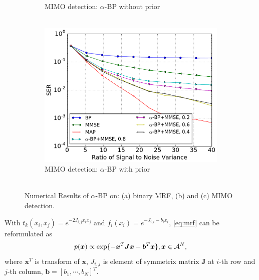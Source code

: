 \documentclass[conference]{IEEEtran}
\begin{document}
\begin{figure}[!ht]
\begin{subfigure}{.33\textwidth}
    \vspace{-0.6cm}
    \caption{MIMO detection: $\alpha$-BP without prior\\~}\label{fig:mimo_a}
  \end{subfigure}
  \begin{subfigure}{.33\textwidth}
    \includegraphics[width=1\linewidth]{figures/prior_mmse_alpha_compare_crop.pdf}
    \vspace{-0.6cm}
    \caption{MIMO detection: $\alpha$-BP with prior\\~}\label{fig:mimo_b}
  \end{subfigure}
  \vspace{-0.3cm}
  \caption{Numerical Results of $\alpha$-BP on: (a) binary MRF, (b) and (c) MIMO detection.}
  \vspace{0.3cm}
  \label{fig:mimo_detection}
\end{figure}
With $t_k(x_i, x_j) = e^{-2J_{i,j}x_i x_j}$ and $f_i(x_i) = e^{-J_{i,i}-b_i x_i}$, \autoref{eq:mrf} can be reformulated as
\begin{equation}
  p(\bm{x}) \propto \exp\{-\bm{x}^{T}\bm{J}\bm{x} - \bm{b}^{T}\bm{x}\}, \bm{x} \in \mathcal{A}^N,
\end{equation}
where $\bm{x}^{T}$ is transform of $\bm{x}$, $J_{i,j}$ is element of symmetrix matrix $\bm{J}$ at $i$-th row and $j$-th column, $\bm{b} = [b_1, \cdots, b_N]^T$.
\end{document}
